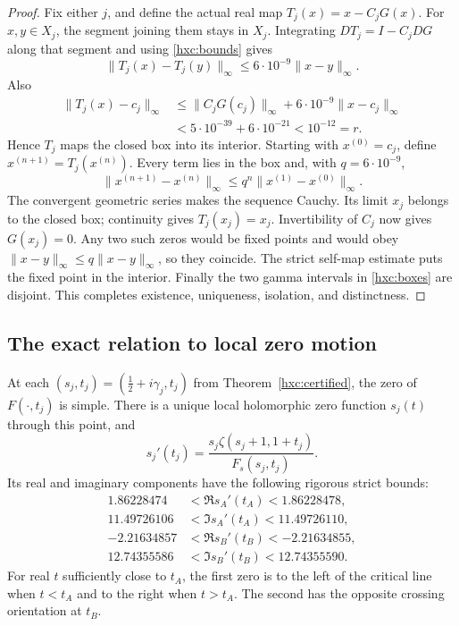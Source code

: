 \begin{proof}
Fix either \(j\), and define the actual real map
\(T_j(x)=x-C_jG(x)\). For \(x,y\in X_j\), the segment joining them
stays in \(X_j\). Integrating \(DT_j=I-C_jDG\) along that segment
and using \eqref{hxc:bounds} gives
\[
 \|T_j(x)-T_j(y)\|_\infty
 \le 6\cdot10^{-9}\|x-y\|_\infty.
\]
Also
\begin{align*}
 \|T_j(x)-c_j\|_\infty
 &\le \|C_jG(c_j)\|_\infty+
       6\cdot10^{-9}\|x-c_j\|_\infty\\
 &<5\cdot10^{-39}+6\cdot10^{-21}<10^{-12}=r.
\end{align*}
Hence \(T_j\) maps the closed box into its interior. Starting with
\(x^{(0)}=c_j\), define \(x^{(n+1)}=T_j(x^{(n)})\). Every term
lies in the box and, with \(q=6\cdot10^{-9}\),
\[
 \|x^{(n+1)}-x^{(n)}\|_\infty
 \le q^n\|x^{(1)}-x^{(0)}\|_\infty.
\]
The convergent geometric series makes the sequence Cauchy. Its limit
\(x_j\) belongs to the closed box; continuity gives
\(T_j(x_j)=x_j\). Invertibility of \(C_j\) now gives \(G(x_j)=0\).
Any two such zeros would be fixed points and would obey
\(\|x-y\|_\infty\le q\|x-y\|_\infty\), so they coincide.
The strict self-map estimate puts the fixed point in the interior.
Finally the two gamma intervals in \eqref{hxc:boxes} are disjoint.
This completes existence, uniqueness, isolation, and distinctness.
\end{proof}

\subsection{The exact relation to local zero motion}

\begin{hxctheorem}\label{hxc:transverse}
At each \((s_j,t_j)=(\tfrac12+i\gamma_j,t_j)\) from
Theorem~\ref{hxc:certified}, the zero of \(F(\cdot,t_j)\) is simple.
There is a unique local holomorphic zero function \(s_j(t)\) through
this point, and
\begin{equation}\label{hxc:velocity}
 s_j'(t_j)=
 \frac{s_j\zeta(s_j+1,1+t_j)}{F_s(s_j,t_j)}.
\end{equation}
Its real and imaginary components have the following rigorous strict
bounds:
\begin{align*}
 1.86228474&<\Re s_A'(t_A)<1.86228478,\\
 11.49726106&<\Im s_A'(t_A)<11.49726110,\\
 -2.21634857&<\Re s_B'(t_B)<-2.21634855,\\
 12.74355586&<\Im s_B'(t_B)<12.74355590.
\end{align*}
For real \(t\) sufficiently close to \(t_A\), the first zero is to the
left of the critical line when \(t<t_A\) and to the right when
\(t>t_A\). The second has the opposite crossing orientation at \(t_B\).
\end{hxctheorem}

